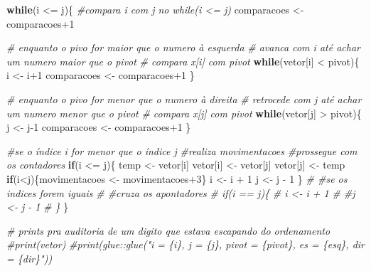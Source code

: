 \documentclass[
]{article}
\newenvironment{Shaded}{\begin{snugshade}}{\end{snugshade}}
\newcommand{\CommentTok}[1]{\textcolor[rgb]{0.56,0.35,0.01}{\textit{#1}}}
\newcommand{\ControlFlowTok}[1]{\textcolor[rgb]{0.13,0.29,0.53}{\textbf{#1}}}
\newcommand{\DecValTok}[1]{\textcolor[rgb]{0.00,0.00,0.81}{#1}}
\newcommand{\NormalTok}[1]{#1}
\newcommand{\OtherTok}[1]{\textcolor[rgb]{0.56,0.35,0.01}{#1}}
\newcommand{\SpecialCharTok}[1]{\textcolor[rgb]{0.00,0.00,0.00}{#1}}
\begin{document}
\begin{Shaded}
\begin{Highlighting}[]
  \ControlFlowTok{while}\NormalTok{(i }\SpecialCharTok{\textless{}=}\NormalTok{ j)\{}
    \CommentTok{\#compara i com j no while(i \textless{}= j)}
\NormalTok{    comparacoes }\OtherTok{\textless{}{-}}\NormalTok{ comparacoes}\SpecialCharTok{+}\DecValTok{1} 
    
    \CommentTok{\# enquanto o pivo for maior que o numero à esquerda}
    \CommentTok{\# avanca com i até achar um numero maior que o pivot}
    \CommentTok{\# compara x[i] com pivot}
    \ControlFlowTok{while}\NormalTok{(vetor[i] }\SpecialCharTok{\textless{}}\NormalTok{ pivot)\{}
\NormalTok{      i }\OtherTok{\textless{}{-}}\NormalTok{ i}\SpecialCharTok{+}\DecValTok{1} 
\NormalTok{      comparacoes }\OtherTok{\textless{}{-}}\NormalTok{ comparacoes}\SpecialCharTok{+}\DecValTok{1} 
\NormalTok{    \}}
    
    \CommentTok{\# enquanto o pivo for menor que o numero à direita}
    \CommentTok{\# retrocede com j até achar um numero menor que o pivot}
    \CommentTok{\# compara x[j] com pivot}
    \ControlFlowTok{while}\NormalTok{(vetor[j] }\SpecialCharTok{\textgreater{}}\NormalTok{ pivot)\{ }
\NormalTok{      j }\OtherTok{\textless{}{-}}\NormalTok{ j}\DecValTok{{-}1} 
\NormalTok{      comparacoes }\OtherTok{\textless{}{-}}\NormalTok{ comparacoes}\SpecialCharTok{+}\DecValTok{1} 
\NormalTok{    \}}
    
    \CommentTok{\#se o índice i for menor que o índice j}
    \CommentTok{\#realiza movimentacoes}
    \CommentTok{\#prossegue com os contadores}
    \ControlFlowTok{if}\NormalTok{(i }\SpecialCharTok{\textless{}=}\NormalTok{ j)\{ }
\NormalTok{      temp }\OtherTok{\textless{}{-}}\NormalTok{ vetor[i] }
\NormalTok{      vetor[i] }\OtherTok{\textless{}{-}}\NormalTok{ vetor[j]}
\NormalTok{      vetor[j] }\OtherTok{\textless{}{-}}\NormalTok{ temp}
      \ControlFlowTok{if}\NormalTok{(i}\SpecialCharTok{\textless{}}\NormalTok{j)\{movimentacoes }\OtherTok{\textless{}{-}}\NormalTok{ movimentacoes}\SpecialCharTok{+}\DecValTok{3}\NormalTok{\}}
\NormalTok{      i }\OtherTok{\textless{}{-}}\NormalTok{ i }\SpecialCharTok{+} \DecValTok{1} 
\NormalTok{      j }\OtherTok{\textless{}{-}}\NormalTok{ j }\SpecialCharTok{{-}} \DecValTok{1}
\NormalTok{    \} }
    \CommentTok{\# \#se os indices forem iguais}
    \CommentTok{\# \#cruza os apontadores}
    \CommentTok{\# if(i == j)\{ }
    \CommentTok{\#   i \textless{}{-} i + 1 }
    \CommentTok{\#   \#j \textless{}{-} j {-} 1}
    \CommentTok{\# \}}
\NormalTok{  \}}
  
  \CommentTok{\# prints pra auditoria de um digito que estava escapando do ordenamento}
  \CommentTok{\#print(vetor)}
  \CommentTok{\#print(glue::glue("i = \{i\}, j = \{j\}, pivot = \{pivot\}, es = \{esq\}, dir = \{dir\}"))}
  

\end{Highlighting}
\end{Shaded}
\end{document}
